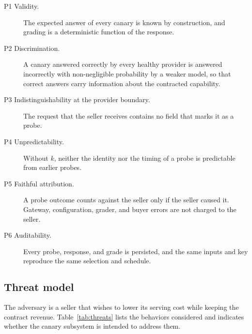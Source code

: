 \begin{description}
  \item[P1 Validity.] The expected answer of every canary is known by
    construction, and grading is a deterministic function of the response.
  \item[P2 Discrimination.] A canary answered correctly by every healthy
    provider is answered incorrectly with non-negligible probability by a
    weaker model, so that correct answers carry information about the
    contracted capability.
  \item[P3 Indistinguishability at the provider boundary.] The request that the
    seller receives contains no field that marks it as a probe.
  \item[P4 Unpredictability.] Without $k$, neither the identity nor the timing
    of a probe is predictable from earlier probes.
  \item[P5 Faithful attribution.] A probe outcome counts against the seller
    only if the seller caused it. Gateway, configuration, grader, and buyer
    errors are not charged to the seller.
  \item[P6 Auditability.] Every probe, response, and grade is persisted, and the
    same inputs and key reproduce the same selection and schedule.
\end{description}

\subsection{Threat model}
\label{sec:threat_model}

The adversary is a seller that wishes to lower its serving cost while keeping
the contract revenue. Table~\ref{tab:threats} lists the behaviors considered
and indicates whether the canary subsystem is intended to address them.

